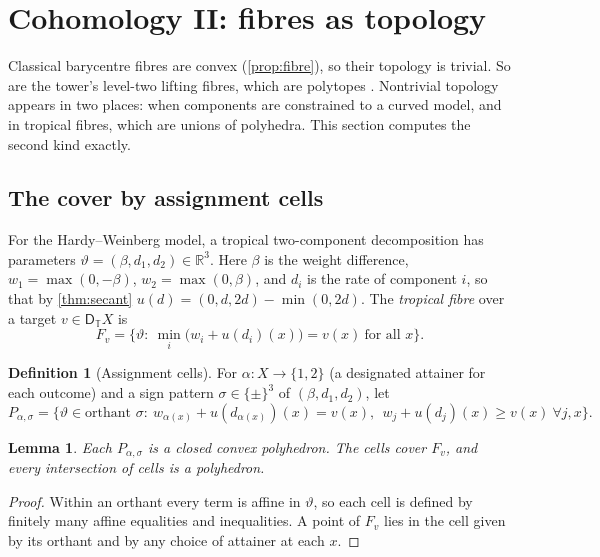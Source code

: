 \documentclass[11pt]{article}
\newtheorem{lemma}[theorem]{Lemma}
\theoremstyle{definition}
\newtheorem{definition}[theorem]{Definition}
\newcommand{\DT}{\mathsf D_{\mathbb T}}
\newcommand{\R}{\mathbb R}
\begin{document}
\FloatBarrier
\section{Cohomology II: fibres as topology}\label{sec:fibre-topology}
Classical barycentre fibres are convex (\cref{prop:fibre}), so their topology is trivial. So are the tower's level-two lifting fibres,
which are polytopes \cite[Def.~10.14]{Tower}. Nontrivial topology appears in two places: when components are constrained to a curved
model, and in tropical fibres, which are unions of polyhedra. This section computes the second kind exactly.

\subsection{The cover by assignment cells}
For the Hardy--Weinberg model, a tropical two-component decomposition has parameters $\vartheta=(\beta,d_1,d_2)\in\R^3$. Here $\beta$ is
the weight difference, $w_1=\max(0,-\beta)$, $w_2=\max(0,\beta)$, and $d_i$ is the rate of component $i$, so that by \cref{thm:secant}
$u(d)=(0,d,2d)-\min(0,2d)$. The \emph{tropical fibre} over a target $v\in\DT X$ is
\[
F_v=\big\{\vartheta:\ \min_i\big(w_i+u(d_i)(x)\big)=v(x)\ \text{for all }x\big\}.
\]

\begin{definition}[Assignment cells]
For $\alpha\colon X\to\{1,2\}$ (a designated attainer for each outcome) and a sign pattern $\sigma\in\{\pm\}^3$ of $(\beta,d_1,d_2)$, let
\[
P_{\alpha,\sigma}=\big\{\vartheta\in\text{orthant }\sigma:\ w_{\alpha(x)}+u(d_{\alpha(x)})(x)=v(x),\ \ w_j+u(d_j)(x)\ge v(x)\ \forall j,x\big\}.
\]
\end{definition}

\begin{lemma}
Each $P_{\alpha,\sigma}$ is a closed convex polyhedron. The cells cover $F_v$, and every intersection of cells is a polyhedron.
\end{lemma}
\begin{proof}
Within an orthant every term is affine in $\vartheta$, so each cell is defined by finitely many affine equalities and inequalities. A
point of $F_v$ lies in the cell given by its orthant and by any choice of attainer at each $x$.
\end{proof}
\end{document}
